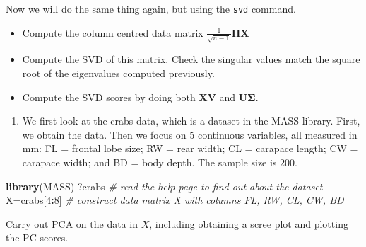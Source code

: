 \documentclass[]{book}
\newenvironment{Shaded}{\begin{snugshade}}{\end{snugshade}}
\newcommand{\CommentTok}[1]{\textcolor[rgb]{0.56,0.35,0.01}{\textit{#1}}}
\newcommand{\DataTypeTok}[1]{\textcolor[rgb]{0.13,0.29,0.53}{#1}}
\newcommand{\DecValTok}[1]{\textcolor[rgb]{0.00,0.00,0.81}{#1}}
\newcommand{\KeywordTok}[1]{\textcolor[rgb]{0.13,0.29,0.53}{\textbf{#1}}}
\newcommand{\NormalTok}[1]{#1}
\newcommand{\OperatorTok}[1]{\textcolor[rgb]{0.81,0.36,0.00}{\textbf{#1}}}
\newcommand{\OtherTok}[1]{\textcolor[rgb]{0.56,0.35,0.01}{#1}}
\newcommand{\StringTok}[1]{\textcolor[rgb]{0.31,0.60,0.02}{#1}}
\providecommand{\tightlist}{%
  \setlength{\itemsep}{0pt}\setlength{\parskip}{0pt}}
\theoremstyle{definition}
\theoremstyle{definition}
\theoremstyle{definition}
\theoremstyle{remark}
\begin{document}
Now we will do the same thing again, but using the \texttt{svd} command.

\begin{itemize}
\tightlist
\item
  Compute the column centred data matrix \(\frac{1}{\sqrt{n-1}}\boldsymbol H\boldsymbol X\)
\item
  Compute the SVD of this matrix. Check the singular values match the square root of the eigenvalues computed previously.
\item
  Compute the SVD scores by doing both \(\boldsymbol X\boldsymbol V\) and \(\boldsymbol U\boldsymbol \Sigma\).
\end{itemize}

\begin{enumerate}
\def\labelenumi{\arabic{enumi}.}
\setcounter{enumi}{1}
\tightlist
\item
  We first look at the crabs data, which is a dataset in the MASS library. First, we obtain the data.
  Then we focus on 5 continuous variables, all measured in mm: FL = frontal lobe size; RW = rear width; CL = carapace length;
  CW = carapace width; and BD = body depth. The sample size is \(200\).
\end{enumerate}

\begin{Shaded}
\begin{Highlighting}[]
\KeywordTok{library}\NormalTok{(MASS)}
\NormalTok{?crabs           }\CommentTok{# read the help page to find out about the dataset}
\NormalTok{X=crabs[}\DecValTok{4}\OperatorTok{:}\DecValTok{8}\NormalTok{]     }\CommentTok{# construct data matrix X with columns FL, RW, CL, CW, BD}
\end{Highlighting}
\end{Shaded}

Carry out PCA on the data in \(X\), including obtaining a scree plot and plotting the PC scores.

\begin{Shaded}
\end{Shaded}
\end{document}
